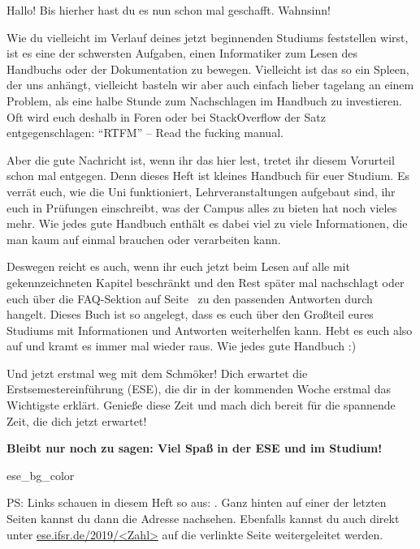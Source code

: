 

Hallo! Bis hierher hast du es nun schon mal geschafft. Wahnsinn!

Wie du vielleicht im Verlauf deines jetzt beginnenden Studiums feststellen wirst, ist es eine der schwersten Aufgaben, einen Informatiker zum Lesen des Handbuchs oder der Dokumentation zu bewegen. Vielleicht ist das so ein Spleen, der uns anhängt, vielleicht basteln wir aber auch einfach lieber tagelang an einem Problem, als eine halbe Stunde zum Nachschlagen im Handbuch zu investieren.
Oft wird euch deshalb in Foren oder bei StackOverflow der Satz entgegenschlagen: \enquote{RTFM} -- Read the fucking manual.

Aber die gute Nachricht ist, wenn ihr das hier lest, tretet ihr diesem Vorurteil schon mal entgegen. Denn dieses Heft ist kleines Handbuch für euer Studium.
Es verrät euch, wie die Uni funktioniert, Lehrveranstaltungen aufgebaut sind, ihr euch in Prüfungen einschreibt, was der Campus alles zu bieten hat noch vieles mehr.
Wie jedes gute Handbuch enthält es dabei viel zu viele Informationen, die man kaum auf einmal brauchen oder verarbeiten kann.

Deswegen reicht es auch, wenn ihr euch jetzt beim Lesen auf alle mit  gekennzeichneten Kapitel beschränkt und den Rest später mal nachschlagt oder euch über die FAQ-Sektion auf Seite~\pageref{sec:faq} zu den passenden Antworten durch hangelt.
Dieses Buch ist so angelegt, dass es euch über den Großteil eures Studiums mit Informationen und Antworten weiterhelfen kann. Hebt es euch also auf und kramt es immer mal wieder raus. Wie jedes gute Handbuch :)

Und jetzt erstmal weg mit dem Schmöker! Dich erwartet die Erstsemestereinführung (ESE), die dir in der kommenden Woche erstmal das Wichtigste erklärt.
Genieße diese Zeit und mach dich bereit für die spannende Zeit, die dich jetzt erwartet!

\textbf{Bleibt nur noch zu sagen: Viel Spaß in der ESE und im Studium!}


\bigskip
\begin{awesomeblock}{2pt}{\faLightbulb[regular]}{ese_bg_color}
    \begin{minipage}[t]{.82\textwidth}
\small PS\@: Links schauen in diesem Heft so aus: . Ganz hinten auf einer der letzten Seiten kannst du dann die Adresse nachsehen. Ebenfalls kannst du auch direkt unter \url{ese.ifsr.de/2019/<Zahl>} auf die verlinkte Seite weitergeleitet werden.
    \end{minipage}
\end{awesomeblock}
